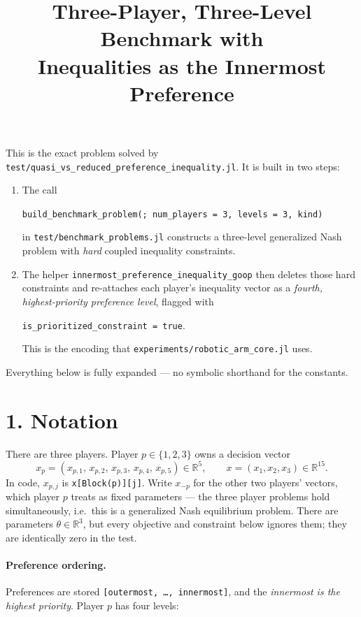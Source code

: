 \documentclass[11pt]{article}
\title{Three-Player, Three-Level Benchmark with\\ Inequalities as the Innermost Preference}
\author{}
\date{}
\begin{document}
\maketitle

This is the exact problem solved by
\texttt{test/quasi\_vs\_reduced\_preference\_inequality.jl}. It is built in two steps:

\begin{enumerate}
  \item The call
        \begin{center}
          \texttt{build\_benchmark\_problem(; num\_players = 3, levels = 3, kind)}
        \end{center}
        in \texttt{test/benchmark\_problems.jl} constructs a three-level generalized
        Nash problem with \emph{hard} coupled inequality constraints.
  \item The helper \texttt{innermost\_preference\_inequality\_goop} then deletes
        those hard constraints and re-attaches each player's inequality vector as a
        \emph{fourth, highest-priority preference level}, flagged with
        \begin{center}
          \texttt{is\_prioritized\_constraint = true}.
        \end{center}
        This is the encoding that \texttt{experiments/robotic\_arm\_core.jl} uses.
\end{enumerate}

Everything below is fully expanded --- no symbolic shorthand for the constants.

\section*{1. Notation}

There are three players. Player \(p \in \{1,2,3\}\) owns a decision vector
\[
  x_p = (x_{p,1},\, x_{p,2},\, x_{p,3},\, x_{p,4},\, x_{p,5}) \in \mathbb{R}^5,
  \qquad
  x = (x_1,x_2,x_3) \in \mathbb{R}^{15}.
\]
In code, \(x_{p,j}\) is \texttt{x[Block(p)][j]}. Write \(x_{-p}\) for the other two players'
vectors, which player \(p\) treats as fixed parameters --- the three player problems hold
simultaneously, i.e.\ this is a generalized Nash equilibrium problem. There are parameters
\(\theta \in \mathbb{R}^3\), but every objective and constraint below ignores them; they are
identically zero in the test.

\paragraph{Preference ordering.} Preferences are stored \texttt{[outermost, \dots, innermost]},
and the \emph{innermost is the highest priority}. Player \(p\) has four levels:
\end{document}
